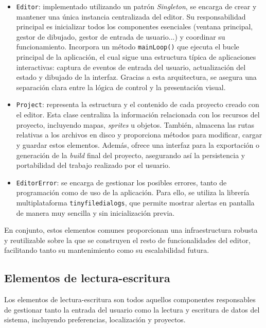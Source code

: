 \begin{itemize}
	\item \texttt{Editor}: implementado utilizando un patrón \textit{Singleton}, se encarga de crear y mantener una única instancia centralizada del editor. Su responsabilidad principal es inicializar todos los componentes esenciales (ventana principal, gestor de dibujado, gestor de entrada de usuario...) y coordinar su funcionamiento. Incorpora un método \texttt{mainLoop()} que ejecuta el bucle principal de la aplicación, el cual sigue una estructura típica de aplicaciones interactivas: captura de eventos de entrada del usuario, actualización del estado y dibujado de la interfaz. Gracias a esta arquitectura, se asegura una separación clara entre la lógica de control y la presentación visual.
	\item \texttt{Project}: representa la estructura y el contenido de cada proyecto creado con el editor. Esta clase centraliza la información relacionada con los recursos del proyecto, incluyendo mapas, \textit{sprites} u objetos. También, almacena las rutas relativas a los archivos en disco y proporciona métodos para modificar, cargar y guardar estos elementos. Además, ofrece una interfaz para la exportación o generación de la \textit{build} final del proyecto, asegurando así la persistencia y portabilidad del trabajo realizado por el usuario.
	\item \texttt{EditorError}: se encarga de gestionar los posibles errores, tanto de programación como de uso de la aplicación. Para ello, se utiliza la librería multiplataforma \texttt{tinyfiledialogs}, que permite mostrar alertas en pantalla de manera muy sencilla y sin inicialización previa.
\end{itemize}

En conjunto, estos elementos comunes proporcionan una infraestructura robusta y reutilizable sobre la que se construyen el resto de funcionalidades del editor, facilitando tanto su mantenimiento como su escalabilidad futura.

\subsection{Elementos de lectura-escritura}
Los elementos de lectura-escritura son todos aquellos componentes responsables de gestionar tanto la entrada del usuario como la lectura y escritura de datos del sistema, incluyendo preferencias, localización y proyectos.

